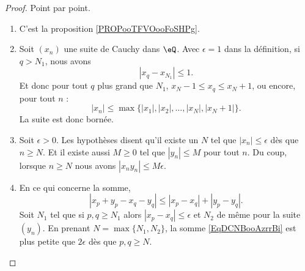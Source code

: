 \begin{proof}
    Point par point.
    \begin{enumerate}
        \item

            C'est la proposition \ref{PROPooTFVOooFoSHPg}.

        \item
            Soit \( (x_n)\) une suite de Cauchy dans \( \eQ\). Avec \( \epsilon=1\) dans la définition, si \( q>N_1\), nous avons
            \begin{equation}
                | x_q-x_{N_1} |\leq 1.
            \end{equation}
            Et donc pour tout \( q\) plus grand que \( N_1\), \( x_N-1\leq x_q\leq x_N+1\), ou encore, pour tout \( n\) :
            \begin{equation}
                | x_n |\leq\max\{ | x_1 |,| x_2 |,\ldots,| x_N |,| x_N+1 | \}.
            \end{equation}
            La suite est donc bornée.
        \item
            Soit \(\epsilon>0\). Les hypothèses disent qu'il existe un \( N\) tel que \( | x_n |\leq \epsilon\) dès que \( n\geq N\). Et il existe aussi \( M\geq 0\) tel que \( | y_n |\leq M\) pour tout \( n\). Du coup, lorsque \( n\geq N\) nous avons \( | x_ny_n |\leq M\epsilon\).
        \item
            En ce qui concerne la somme,
            \begin{equation}        \label{EqDCNBooAzrrBi}
                | x_p+y_p-x_q-y_q |\leq | x_p-x_q |+| y_p-y_q |.
            \end{equation}
            Soit \( N_1\) tel que si \( p,q\geq N_1\) alors \( | x_p-x_q |\leq \epsilon\) et \( N_2\) de même pour la suite \( (y_n)\). En prenant \( N=\max\{ N_1,N_2 \}\), la somme \eqref{EqDCNBooAzrrBi} est plus petite que \( 2\epsilon\) dès que \( p,q\geq N\).


\end{enumerate}
\end{proof}
